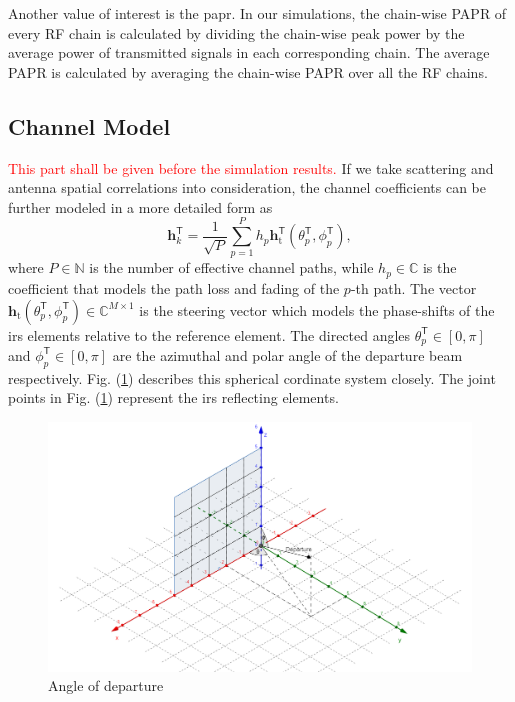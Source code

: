 \documentclass[12pt,draftclsnofoot,onecolumn,journal]{IEEEtran}
\newcommand{\cmt}[1]{\textcolor{red}{#1} }
\begin{document}
Another value of interest is  the \ac{papr}. In our simulations, the chain-wise PAPR of every RF chain is calculated by dividing the chain-wise peak power by the average power of transmitted signals in each corresponding chain. The average PAPR is calculated by averaging the chain-wise PAPR over all the RF chains. 

\subsection{Channel Model}
\cmt{This part shall be given before the simulation results.}
If we take scattering and antenna spatial correlations into consideration, the channel coefficients can be further modeled in a more detailed form as \cite{jamali2020intelligent}
\begin{equation}
\mathbf h_k^{\mathsf{T}}=\frac{1}{\sqrt{P}}\sum_{p=1}^{P}h_p\mathbf h_{\mathrm t}^{\mathsf{T}}(\theta_p^{\mathsf{T}}, \phi_p^{\mathsf{T}}),
\label{eq:fullchanneldes}
\end{equation}
where $P\in \mathbb N$ is the number of effective channel paths, while $h_p\in \mathbb C$ is the coefficient that models the path loss and fading of the $p$-th path. The vector $\mathbf h_{\mathrm t}(\theta_p^{\mathsf{T}}, \phi_p^{\mathsf{T}}) \in \mathbb C^{M\times 1}$ is the steering vector which models the phase-shifts of the \ac{irs} elements relative to the reference element. The directed angles $\theta_p^{\mathsf{T}}\in[0,\pi]$ and  $\phi_p^{\mathsf{T}}\in[0,\pi]$ are the azimuthal and polar angle of the departure beam respectively. Fig. (\ref{fig:sphangle}) describes this spherical cordinate system closely. The joint points in Fig. (\ref{fig:sphangle}) represent the \ac{irs} reflecting elements.

\begin{figure}[htbp]
\includegraphics[width=6in]{channelillus.png} 
\caption{Angle of departure} \label{fig:sphangle}
\end{figure}
\end{document}
